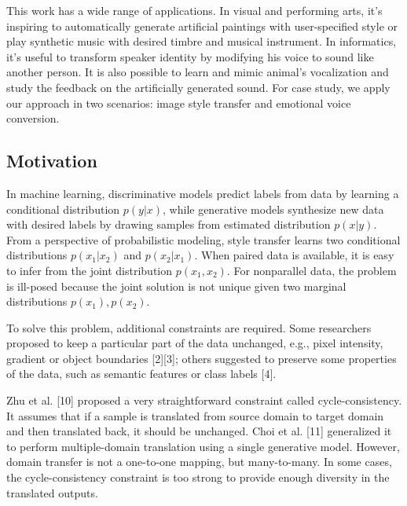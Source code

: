 \documentclass{article}
\begin{document}
This work has a wide range of applications. In visual and performing arts, it's inspiring to automatically generate artificial paintings with user-specified style or play synthetic music with desired timbre and musical instrument. In informatics, it's useful to transform speaker identity by modifying his voice to sound like another person. It is also possible to learn and mimic animal's vocalization and study the feedback on the artificially generated sound. For case study, we apply our approach in two scenarios: image style transfer and emotional voice conversion.

\subsection{Motivation} %
In machine learning, discriminative models predict labels from data by learning a conditional distribution $p(y|x)$, while generative models {\color{blue} synthesize} new data with desired labels by drawing samples from estimated distribution $p(x|y)$. From a perspective of probabilistic modeling, style transfer learns two conditional distributions $p(x_1|x_2)$ and $p(x_2|x_1)$. When paired data is available, it is easy to infer from the joint distribution $p(x_1,x_2)$. For nonparallel data, the problem is ill-posed because the joint solution is not unique given two marginal distributions $p(x_1), p(x_2)$.

To solve this problem, additional constraints are required. Some researchers proposed to keep a particular part of the data unchanged, e.g., pixel intensity, gradient or object boundaries [2][3]; others suggested to preserve some properties of the data, such as semantic features or class labels [4].

Zhu et al. [10] proposed a very straightforward constraint called cycle-consistency. It assumes that if a sample is translated from source domain to target domain and then translated back, it should be unchanged. Choi et al. [11] generalized it to perform multiple-domain translation using a single generative model. However, domain transfer is not a one-to-one mapping, but many-to-many. In some cases, the cycle-consistency constraint is too strong to provide enough diversity in the translated outputs.
\end{document}
